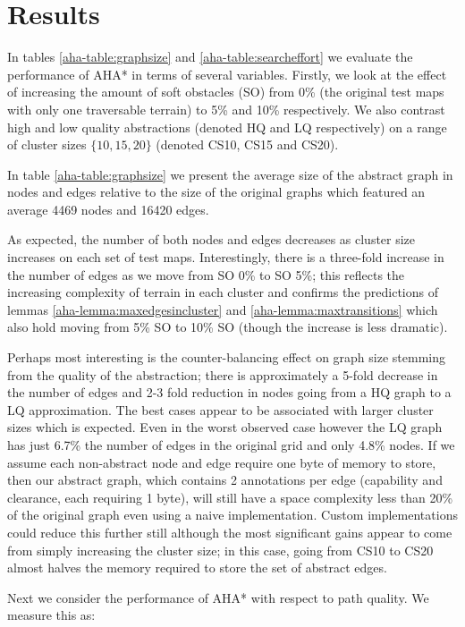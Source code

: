 \section{Results}
In tables \ref{aha-table:graphsize} and \ref{aha-table:searcheffort} we evaluate the performance of AHA* in terms of several variables. 
Firstly, we look at the effect of increasing the amount of soft obstacles (SO) from 0\% (the original test maps with only one traversable terrain) to 5\% and 10\% respectively. 
We also contrast high and low quality abstractions (denoted HQ and LQ respectively) on a range of cluster sizes $\lbrace 10, 15, 20 \rbrace$ (denoted CS10, CS15 and CS20).
\par \indent
In table \ref{aha-table:graphsize} we present the average size of the abstract graph in nodes and edges relative to the size of the original graphs which featured an average 4469 nodes and 16420 edges. 

As expected, the number of both nodes and edges decreases as cluster size increases on each set of test maps. Interestingly, there is a three-fold increase in the number of edges as we move from SO 0\% to SO 5\%; this reflects the increasing complexity of terrain in each cluster and confirms the predictions of lemmas \ref{aha-lemma:maxedgesincluster} and \ref{aha-lemma:maxtransitions} which also hold moving from 5\% SO to 10\% SO (though the increase is less dramatic). 
\par \indent
Perhaps most interesting is the counter-balancing effect on graph size stemming from the quality of the abstraction; there is approximately a 5-fold decrease in the number of edges and 2-3 fold reduction in nodes going from a HQ graph to a LQ approximation.
The best cases appear to be associated with larger cluster sizes which is expected. 
Even in the worst observed case however the LQ graph has just 6.7\% the number of edges in the original grid and only 4.8\% nodes. 
If we assume each non-abstract node and edge require one byte of memory to store, then our abstract graph, which contains 2 annotations per edge (capability and clearance, each requiring 1 byte), will still have a space complexity less than 20\% of the original graph even using a naive implementation. 
Custom implementations could reduce this further still although the most significant gains appear to come from simply increasing the cluster size; in this case, going from CS10 to CS20 almost halves the memory required to store the set of abstract edges.
\par \indent
Next we consider the performance of AHA* with respect to path quality. We measure this as:
